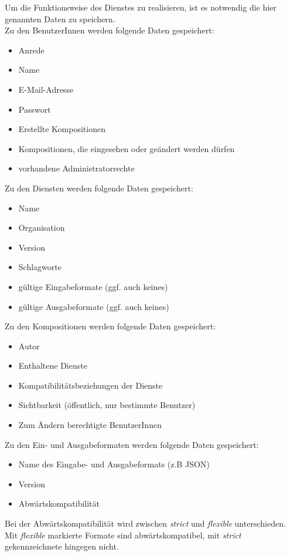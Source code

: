 Um die Funktionsweise des Dienstes zu realisieren, ist es notwendig die hier genannten Daten zu speichern.\\
Zu den BenutzerInnen werden folgende Daten gespeichert:
\begin{itemize}
	\item Anrede
	\item Name
	\item E-Mail-Adresse
	\item Passwort
	\item Erstellte Kompositionen
	\item Kompositionen, die eingesehen oder geändert werden dürfen
	\item vorhandene Administratorrechte
\end{itemize}
Zu den Diensten werden folgende Daten gespeichert:
\begin{itemize}
	\item Name
	\item Organisation
	\item Version
	\item Schlagworte
	\item gültige Eingabeformate (ggf. auch keines)
	\item gültige Ausgabeformate (ggf. auch keines)
\end{itemize}
Zu den Kompositionen werden folgende Daten gespeichert:
\begin{itemize}
	\item Autor
	\item Enthaltene Dienste
	\item Kompatibilitätsbeziehungen der Dienste
	\item Sichtbarkeit (öffentlich, nur bestimmte Benutzer)
	\item Zum Ändern berechtigte BenutzerInnen
\end{itemize}

Zu den Ein- und Ausgabeformaten werden folgende Daten gespeichert:
\begin{itemize}
	\item Name des Eingabe- und Ausgabeformats (z.B JSON)
	\item Version
	\item Abwärtskompatibilität\\
\end{itemize}
Bei der Abwärtskompatibilität wird zwischen \textit{strict} und \textit{flexible} unterschieden. Mit \textit{flexible} markierte Formate sind abwärtskompatibel, mit \textit{strict} gekennzeichnete hingegen nicht.
